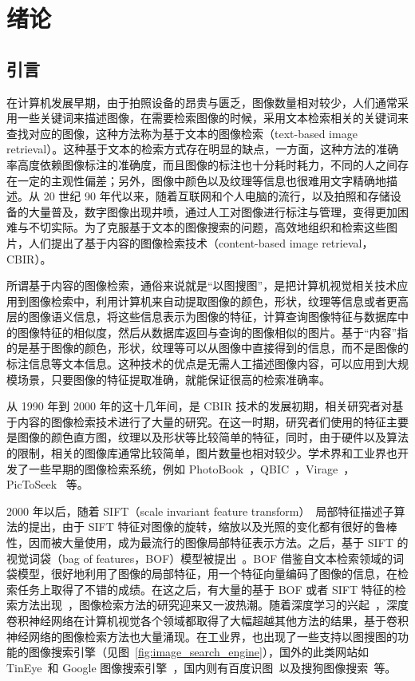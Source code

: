 
\chapter{绪论}
\label{Chapter_introduction}

\section{引言}
在计算机发展早期，由于拍照设备的昂贵与匮乏，图像数量相对较少，人们通常采用一些关键词来描述图像，在需要检索图像的时候，采用文本检索相关的关键词来查找对应的图像，这种方法称为基于文本的图像检索（text-based image retrieval）。这种基于文本的检索方式存在明显的缺点，一方面，这种方法的准确率高度依赖图像标注的准确度，而且图像的标注也十分耗时耗力，不同的人之间存在一定的主观性偏差；另外，图像中颜色以及纹理等信息也很难用文字精确地描述。从 20 世纪 90 年代以来，随着互联网和个人电脑的流行，以及拍照和存储设备的大量普及，数字图像出现井喷，通过人工对图像进行标注与管理，变得更加困难与不切实际。为了克服基于文本的图像搜索的问题，高效地组织和检索这些图片，人们提出了基于内容的图像检索技术（content-based image retrieval，CBIR）。

所谓基于内容的图像检索，通俗来说就是“以图搜图”，是把计算机视觉相关技术应用到图像检索中，利用计算机来自动提取图像的颜色，形状，纹理等信息或者更高层的图像语义信息，将这些信息表示为图像的特征，计算查询图像特征与数据库中的图像特征的相似度，然后从数据库返回与查询的图像相似的图片。基于“内容”指的是基于图像的颜色，形状，纹理等可以从图像中直接得到的信息，而不是图像的标注信息等文本信息。这种技术的优点是无需人工描述图像内容，可以应用到大规模场景，只要图像的特征提取准确，就能保证很高的检索准确率。

从 1990 年到 2000 年的这十几年间，是 CBIR 技术的发展初期，相关研究者对基于内容的图像检索技术进行了大量的研究。在这一时期，研究者们使用的特征主要是图像的颜色直方图，纹理以及形状等比较简单的特征，同时，由于硬件以及算法的限制，相关的图像库通常比较简单，图片数量也相对较少。学术界和工业界也开发了一些早期的图像检索系统，例如 PhotoBook~\cite{Pentland1996PhotobookCM}，QBIC~\cite{Niblack1993TheQP}，Virage~\cite{Bach1996VirageIS}，PicToSeek~\cite{Gevers2000PicToSeekCC} 等。

2000 年以后，随着 SIFT（scale invariant feature transform）~\cite{Lowe2004DistinctiveIF}局部特征描述子算法的提出，由于 SIFT 特征对图像的旋转，缩放以及光照的变化都有很好的鲁棒性，因而被大量使用，成为最流行的图像局部特征表示方法。之后，基于 SIFT 的视觉词袋（bag of features，BOF）模型被提出~\cite{Sivic2003VideoGA}。BOF 借鉴自文本检索领域的词袋模型，很好地利用了图像的局部特征，用一个特征向量编码了图像的信息，在检索任务上取得了不错的成绩。在这之后，有大量的基于 BOF 或者 SIFT 特征的检索方法出现~\cite{Philbin2008LostIQ,Philbin2007ObjectRW,Mikulk2010LearningAF,Arandjelovic2012ThreeTE,Chum2007TotalRA}，图像检索方法的研究迎来又一波热潮。随着深度学习的兴起~\cite{Krizhevsky2012ImageNetCW}，深度卷积神经网络在计算机视觉各个领域都取得了大幅超越其他方法的结果，基于卷积神经网络的图像检索方法也大量涌现。在工业界，也出现了一些支持以图搜图的功能的图像搜索引擎（见图~\ref{fig:image_search_engine}），国外的此类网站如 TinEye~\cite{tineyeImgSearch}和 Google 图像搜索引擎~\cite{googleImgSearch}，国内则有百度识图~\cite{baiduImgSearch}以及搜狗图像搜索~\cite{sougouImgSearch}等。

